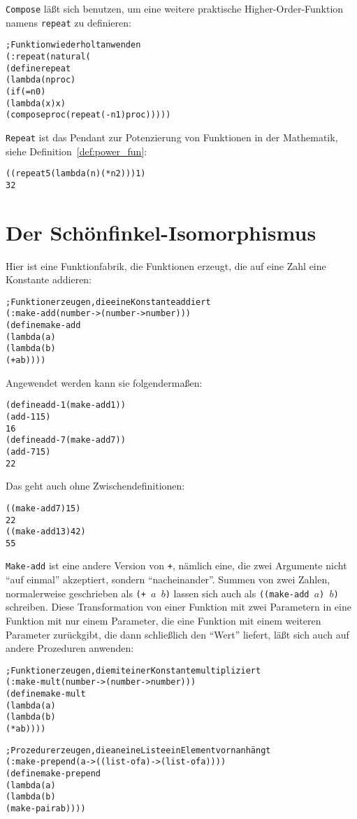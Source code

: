 \texttt{Compose} läßt sich benutzen, um eine weitere praktische
Higher-Order-Funktion namens
\texttt{repeat} zu definieren:
\label{page:repeat}
%
\begin{alltt}
; Funktion wiederholt anwenden
(: repeat (natural (%a -> %a) -> (%a -> %a)))
(define repeat
  (lambda (n proc)
    (if (= n 0)
        (lambda (x) x)
        (compose proc (repeat (- n 1) proc)))))
\end{alltt}
%
\texttt{Repeat} ist das Pendant zur Potenzierung von
Funktionen in der Mathematik, siehe Definition~\ref{def:power_fun}:
%
\begin{alltt}
((repeat 5 (lambda (n) (* n 2))) 1)
\evalsto{} 32
\end{alltt}

\section{Der Schönfinkel-Isomorphismus}
\label{sec:currying}
Hier ist eine Funktionfabrik, die Funktionen erzeugt, die auf eine
Zahl eine Konstante addieren:
%
\begin{alltt}
; Funktion erzeugen, die eine Konstante addiert
(: make-add (number -> (number -> number)))
(define make-add
  (lambda (a)
    (lambda (b)
      (+ a b))))
\end{alltt}
%
Angewendet werden kann sie folgendermaßen:
%
\begin{alltt}
(define add-1 (make-add 1))
(add-1 15)
\evalsto{} 16
(define add-7 (make-add 7))
(add-7 15)
\evalsto{} 22
\end{alltt}
%
Das geht auch ohne Zwischendefinitionen:
%
\begin{alltt}
((make-add 7) 15)
\evalsto{} 22
((make-add 13) 42)
\evalsto{} 55
\end{alltt}
%
\texttt{Make-add} ist eine andere Version von \texttt{+}, nämlich
eine, die zwei Argumente nicht "`auf einmal"' akzeptiert, sondern
"`nacheinander"'.  Summen von zwei Zahlen, normalerweise geschrieben
als \texttt{(+ $a$ $b$)} lassen sich auch als \texttt{((make-add $a$)
  $b$)} schreiben.  Diese Transformation von einer Funktion mit zwei
Parametern in eine Funktion mit nur einem Parameter, die eine Funktion
mit einem weiteren Parameter zurückgibt, die dann schließlich den "`Wert"'
liefert, läßt sich auch auf andere Prozeduren anwenden:
%
\begin{alltt}
; Funktion erzeugen, die mit einer Konstante multipliziert
(: make-mult (number -> (number -> number)))
(define make-mult
  (lambda (a)
    (lambda (b)
      (* a b))))

; Prozedur erzeugen, die an eine Liste ein Element vorn anhängt
(: make-prepend (a -> ((list-of a) -> (list-of a))))
(define make-prepend
  (lambda (a)
    (lambda (b)
      (make-pair a b))))
\end{alltt}
